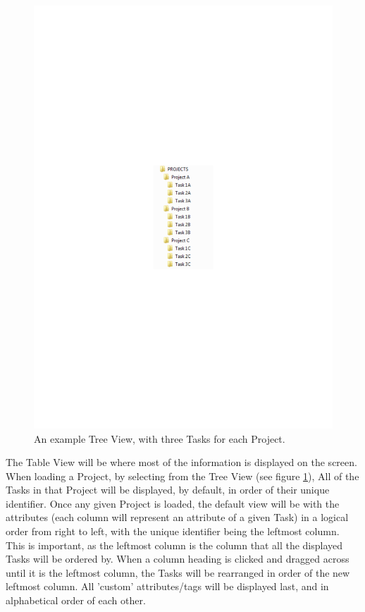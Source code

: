 \begin{figure}[H]
    \includegraphics[width=\textwidth]{./Design/Tree_View_Example.pdf}
    \caption{An example Tree View, with three Tasks for each Project. } \label{fig:TreeViewExample}
\end{figure}

The Table View will be where most of the information is displayed on the screen. When loading a Project, by selecting from the Tree View (see figure \ref{fig:TreeViewExample}), All of the Tasks in that Project will be displayed, by default, in order of their unique identifier. Once any given Project is loaded, the default view will be with the attributes (each column will represent an attribute of a given Task) in a logical order from right to left, with the unique identifier being the leftmost column. This is important, as the leftmost column is the column that all the displayed Tasks will be ordered by. When a column heading is clicked and dragged across until it is the leftmost column, the Tasks will be rearranged in order of the new leftmost column. All 'custom' attributes/tags will be displayed last, and in alphabetical order of each other. 

